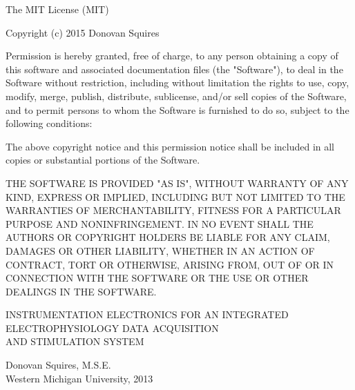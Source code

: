 The MIT License (MIT)

Copyright (c) 2015 Donovan Squires

Permission is hereby granted, free of charge, to any person obtaining a copy
of this software and associated documentation files (the "Software"), to deal
in the Software without restriction, including without limitation the rights
to use, copy, modify, merge, publish, distribute, sublicense, and/or sell
copies of the Software, and to permit persons to whom the Software is
furnished to do so, subject to the following conditions:

The above copyright notice and this permission notice shall be included in all
copies or substantial portions of the Software.

THE SOFTWARE IS PROVIDED "AS IS", WITHOUT WARRANTY OF ANY KIND, EXPRESS OR
IMPLIED, INCLUDING BUT NOT LIMITED TO THE WARRANTIES OF MERCHANTABILITY,
FITNESS FOR A PARTICULAR PURPOSE AND NONINFRINGEMENT. IN NO EVENT SHALL THE
AUTHORS OR COPYRIGHT HOLDERS BE LIABLE FOR ANY CLAIM, DAMAGES OR OTHER
LIABILITY, WHETHER IN AN ACTION OF CONTRACT, TORT OR OTHERWISE, ARISING FROM,
OUT OF OR IN CONNECTION WITH THE SOFTWARE OR THE USE OR OTHER DEALINGS IN THE
SOFTWARE.



% 




\begin{centering}
\begin{singlespace}
	INSTRUMENTATION ELECTRONICS FOR AN INTEGRATED \\ ELECTROPHYSIOLOGY DATA ACQUISITION \\ AND STIMULATION SYSTEM
		
	\vspace{2\baselineskip}
	
	Donovan Squires, M.S.E.\\
	\vspace{\baselineskip}
	Western Michigan University, 2013
\end{singlespace}	
\end{centering}

